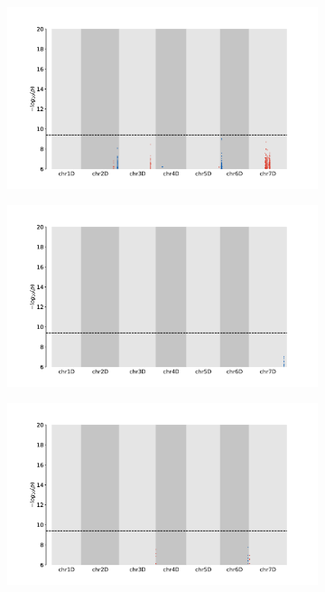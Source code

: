 \documentclass[12pt, letterpaper, ]{report}
\begin{document}
\begin{figure}[h]
        \centering
        \begin{subfigure}[b]{\textwidth}
                \centering
                \includegraphics[scale=0.3]{images/gwas_plots/svgtopng/tf_si_plot.png}
                \label{Fig:tf_si_peak}
        \end{subfigure}
        \begin{subfigure}[b]{\textwidth}
                \centering
                \includegraphics[scale=0.3]{images/gwas_plots/svgtopng/sc_si_plot.png}
                \label{Fig:sc_si_peak}
        \end{subfigure}
        \begin{subfigure}[b]{\textwidth}
                \centering
                \includegraphics[scale=0.3]{images/gwas_plots/svgtopng/gh_si_plot.png}

\end{subfigure}
\end{figure}
\end{document}
